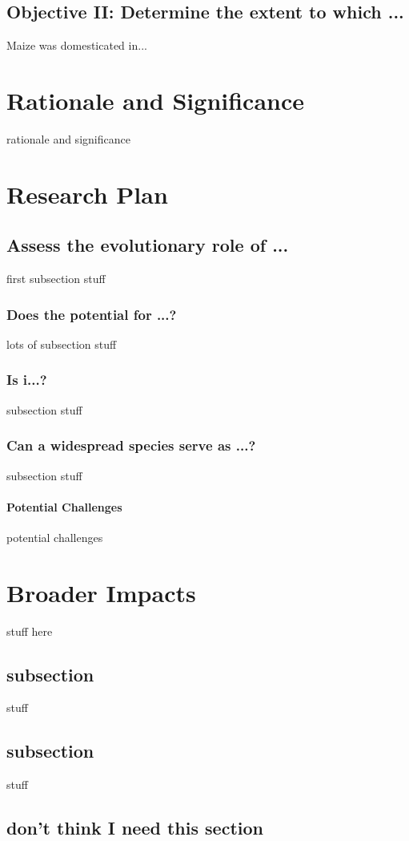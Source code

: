 \subsection*{Objective II: Determine the extent to which ...}
Maize was domesticated in...


\section*{Rationale and Significance} 
 rationale and significance

\section*{Research Plan}


\subsection*{Assess the evolutionary role of ...}
first subsection stuff

\subsubsection*{Does the potential for ...?}
lots of subsection stuff

\subsubsection*{Is i...?}

subsection stuff

\subsubsection*{Can a widespread species serve as ...?}

subsection stuff

\paragraph{Potential Challenges} 
potential challenges 

\section*{Broader Impacts}
stuff here

\subsection*{subsection}
stuff

\subsection*{subsection}
stuff



\subsection*{don't think I need this section} 

